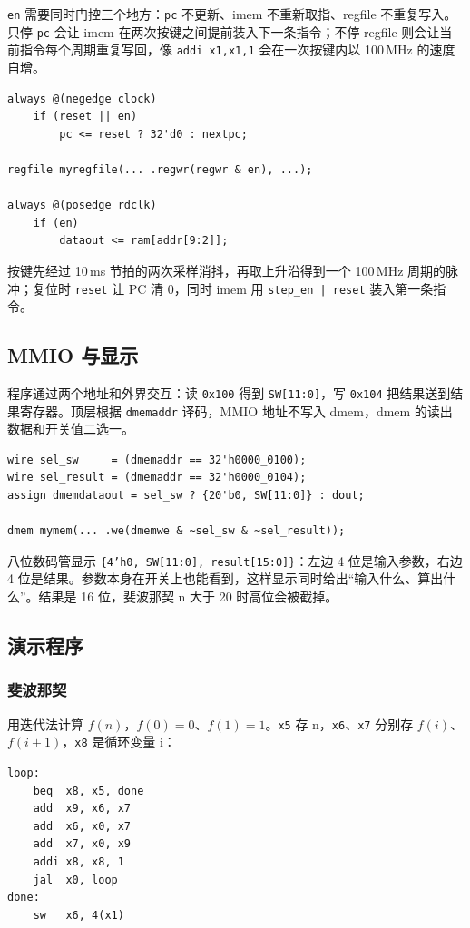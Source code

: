 \documentclass[12pt, a4paper]{ctexart}
\begin{document}
\texttt{en} 需要同时门控三个地方：\texttt{pc} 不更新、imem 不重新取指、regfile 不重复写入。只停 \texttt{pc} 会让 imem 在两次按键之间提前装入下一条指令；不停 regfile 则会让当前指令每个周期重复写回，像 \texttt{addi x1,x1,1} 会在一次按键内以 100\,MHz 的速度自增。

\begin{lstlisting}
always @(negedge clock)
    if (reset || en)
        pc <= reset ? 32'd0 : nextpc;

regfile myregfile(... .regwr(regwr & en), ...);

always @(posedge rdclk)
    if (en)
        dataout <= ram[addr[9:2]];
\end{lstlisting}

\noindent 按键先经过 10\,ms 节拍的两次采样消抖，再取上升沿得到一个 100\,MHz 周期的脉冲；复位时 \texttt{reset} 让 PC 清 0，同时 imem 用 \texttt{step\_en | reset} 装入第一条指令。

\subsection{MMIO 与显示}
程序通过两个地址和外界交互：读 \texttt{0x100} 得到 \texttt{SW[11:0]}，写 \texttt{0x104} 把结果送到结果寄存器。顶层根据 \texttt{dmemaddr} 译码，MMIO 地址不写入 dmem，dmem 的读出数据和开关值二选一。

\begin{lstlisting}
wire sel_sw     = (dmemaddr == 32'h0000_0100);
wire sel_result = (dmemaddr == 32'h0000_0104);
assign dmemdataout = sel_sw ? {20'b0, SW[11:0]} : dout;

dmem mymem(... .we(dmemwe & ~sel_sw & ~sel_result));
\end{lstlisting}

\noindent 八位数码管显示 \texttt{\{4'h0, SW[11:0], result[15:0]\}}：左边 4 位是输入参数，右边 4 位是结果。参数本身在开关上也能看到，这样显示同时给出“输入什么、算出什么”。结果是 16 位，斐波那契 n 大于 20 时高位会被截掉。

\subsection{演示程序}
\subsubsection{斐波那契}
用迭代法计算 $f(n)$，$f(0)=0$、$f(1)=1$。\texttt{x5} 存 n，\texttt{x6}、\texttt{x7} 分别存 $f(i)$、$f(i+1)$，\texttt{x8} 是循环变量 i：

\begin{lstlisting}[language={},numbers=none]
loop:
    beq  x8, x5, done
    add  x9, x6, x7
    add  x6, x0, x7
    add  x7, x0, x9
    addi x8, x8, 1
    jal  x0, loop
done:
    sw   x6, 4(x1)
\end{lstlisting}
\end{document}

